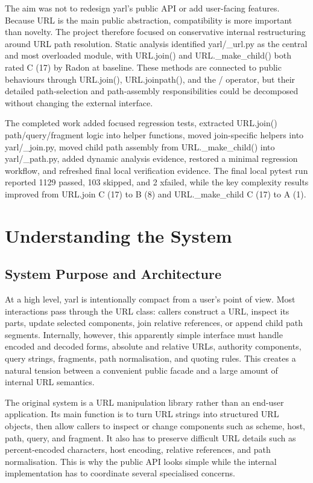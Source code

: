 \documentclass[11pt,a4paper]{article}
\begin{document}
The aim was not to redesign yarl's public API or add user-facing features. Because URL is the main public abstraction, compatibility is more important than novelty. The project therefore focused on conservative internal restructuring around URL path resolution. Static analysis identified yarl/\_url.py as the central and most overloaded module, with URL.join() and URL.\_make\_child() both rated C (17) by Radon at baseline. These methods are connected to public behaviours through URL.join(), URL.joinpath(), and the / operator, but their detailed path-selection and path-assembly responsibilities could be decomposed without changing the external interface.


The completed work added focused regression tests, extracted URL.join() path/query/fragment logic into helper functions, moved join-specific helpers into yarl/\_join.py, moved child path assembly from URL.\_make\_child() into yarl/\_path.py, added dynamic analysis evidence, restored a minimal regression workflow, and refreshed final local verification evidence. The final local pytest run reported 1129 passed, 103 skipped, and 2 xfailed, while the key complexity results improved from URL.join C (17) to B (8) and URL.\_make\_child C (17) to A (1).


\section*{Understanding the System}


\subsection*{System Purpose and Architecture}


At a high level, yarl is intentionally compact from a user's point of view. Most interactions pass through the URL class: callers construct a URL, inspect its parts, update selected components, join relative references, or append child path segments. Internally, however, this apparently simple interface must handle encoded and decoded forms, absolute and relative URLs, authority components, query strings, fragments, path normalisation, and quoting rules. This creates a natural tension between a convenient public facade and a large amount of internal URL semantics.


The original system is a URL manipulation library rather than an end-user application. Its main function is to turn URL strings into structured URL objects, then allow callers to inspect or change components such as scheme, host, path, query, and fragment. It also has to preserve difficult URL details such as percent-encoded characters, host encoding, relative references, and path normalisation. This is why the public API looks simple while the internal implementation has to coordinate several specialised concerns.
\end{document}
